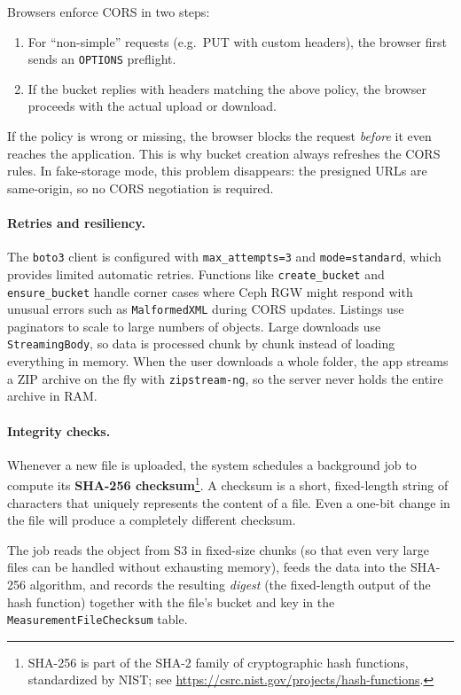 Browsers enforce CORS in two steps:
\begin{enumerate}
	\item For ``non-simple'' requests (e.g.\ PUT with custom headers), the browser first sends an \texttt{OPTIONS} preflight.  
	\item If the bucket replies with headers matching the above policy, the browser proceeds with the actual upload or download.  
\end{enumerate}

If the policy is wrong or missing, the browser blocks the request \emph{before} it even reaches the application.  
This is why bucket creation always refreshes the CORS rules.  
In fake-storage mode, this problem disappears: the presigned URLs are same-origin, so no CORS negotiation is required.

\paragraph{Retries and resiliency.}
The \texttt{boto3} client is configured with \texttt{max\_attempts=3} and \texttt{mode=standard}, 
which provides limited automatic retries.  
Functions like \texttt{create\_bucket} and \texttt{ensure\_bucket} handle corner cases where Ceph RGW 
might respond with unusual errors such as \texttt{MalformedXML} during CORS updates.  
Listings use paginators to scale to large numbers of objects.  
Large downloads use \texttt{StreamingBody}, so data is processed chunk by chunk instead of loading everything in memory.  
When the user downloads a whole folder, the app streams a ZIP archive on the fly with \texttt{zipstream-ng}, 
so the server never holds the entire archive in RAM.

\paragraph{Integrity checks.}
Whenever a new file is uploaded, the system schedules a background job to compute its 
\textbf{SHA-256 checksum}\footnote{SHA-256 is part of the SHA-2 family of cryptographic hash functions, standardized by NIST; see \url{https://csrc.nist.gov/projects/hash-functions}.}.  
A checksum is a short, fixed-length string of characters that uniquely represents the content of a file.  
Even a one-bit change in the file will produce a completely different checksum.  

The job reads the object from S3 in fixed-size chunks (so that even very large files can be handled without exhausting memory), 
feeds the data into the SHA-256 algorithm, and records the resulting \emph{digest} (the fixed-length output of the hash function) together with the file’s bucket and key 
in the \texttt{MeasurementFileChecksum} table.  

